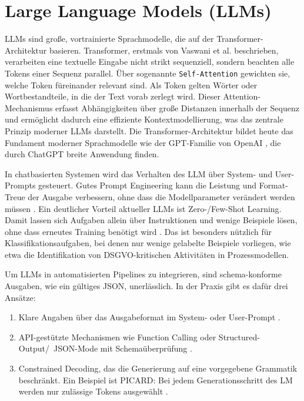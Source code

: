\section{Large Language Models (LLMs)}\label{sec:llms}

\acp{LLM} sind große, vortrainierte Sprachmodelle, die auf der Transformer-Architektur basieren. Transformer, erstmals von Vaswani et al. \cite{vaswani2017attention} beschrieben, verarbeiten eine textuelle Eingabe nicht strikt sequenziell, sondern beachten alle Tokens einer Sequenz parallel. Über sogenannte \texttt{Self-Attention} gewichten sie, welche Token füreinander relevant sind. Als Token gelten Wörter oder Wortbestandteile, in die der Text vorab zerlegt wird. Dieser Attention-Mechanismus erfasst Abhängigkeiten über große Distanzen innerhalb der Sequenz und ermöglicht dadurch eine effiziente Kontextmodellierung, was das zentrale Prinzip moderner \acp{LLM} darstellt. Die Transformer-Architektur bildet heute das Fundament moderner Sprachmodelle wie der GPT-Familie von OpenAI \cite{ibm-gpt, minaee2025largelanguagemodelssurvey, openai-models}, die durch ChatGPT breite Anwendung finden.

In chatbasierten Systemen wird das Verhalten des \ac{LLM} über System- und User-Prompts gesteuert. Gutes Prompt Engineering kann die Leistung und Format-Treue der Ausgabe verbessern, ohne dass die Modellparameter verändert werden müssen \cite{liu2023prompting}. Ein deutlicher Vorteil aktueller \acp{LLM} ist Zero-/Few-Shot Learning. Damit lassen sich Aufgaben allein über Instruktionen und wenige Beispiele lösen, ohne dass erneutes Training benötigt wird \cite{brown2020fewshot, liu2023prompting}. Das ist besonders nützlich für Klassifikationsaufgaben, bei denen nur wenige gelabelte Beispiele vorliegen, wie etwa die Identifikation von \ac{DSGVO}-kritischen Aktivitäten in Prozessmodellen.

Um \acp{LLM} in automatisierten Pipelines zu integrieren, sind schema-konforme Ausgaben, wie ein gültiges JSON, unerlässlich. In der Praxis gibt es dafür drei Ansätze:

\begin{enumerate}
    \item Klare Angaben über das Ausgabeformat im System- oder User-Prompt \cite{liu2023prompting}.
    \item API-gestützte Mechanismen wie Function Calling oder Structured-Output/\linebreak~JSON-Mode mit Schemaüberprüfung \cite{mistralai_structured_output, openai_function_calling_2023, openai_structured_output}.
    \item Constrained Decoding, das die Generierung auf eine vorgegebene Grammatik beschränkt. Ein Beispiel ist PICARD: Bei jedem Generationsschritt des \ac{LM} werden nur zulässige Tokens ausgewählt \cite{scholak2021picard}.
\end{enumerate}


